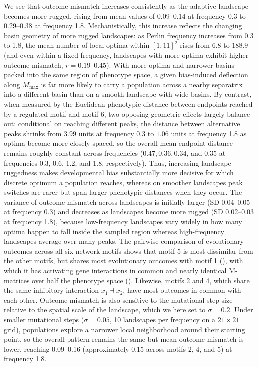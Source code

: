 We see that outcome mismatch increases consistently as the adaptive landscape becomes more rugged, rising from mean values of 0.09--0.14 at frequency 0.3 to 0.29--0.38 at frequency 1.8.
Mechanistically, this increase reflects the changing basin geometry of more rugged landscapes: as Perlin frequency increases from 0.3 to 1.8, the mean number of local optima within $[1, 11]^2$ rises from $6.8$ to $188.9$ (and even within a fixed frequency, landscapes with more optima exhibit higher outcome mismatch, $r = 0.19\text{--}0.45$).
With more optima and narrower basins packed into the same region of phenotype space, a given bias-induced deflection along $M_{\max}$ is far more likely to carry a population across a nearby separatrix into a different basin than on a smooth landscape with wide basins.
By contrast, when measured by the Euclidean phenotypic distance between endpoints reached by a regulated motif and motif 6, two opposing geometric effects largely balance out: conditional on reaching different peaks, the distance between alternative peaks shrinks from $3.99$ units at frequency 0.3 to $1.06$ units at frequency 1.8 as optima become more closely spaced, so the overall mean endpoint distance remains roughly constant across frequencies ($0.47, 0.36, 0.34$, and $0.35$ at frequencies 0.3, 0.6, 1.2, and 1.8, respectively).
Thus, increasing landscape ruggedness makes developmental bias substantially more decisive for which discrete optimum a population reaches, whereas on smoother landscapes peak switches are rarer but span larger phenotypic distances when they occur.
The variance of outcome mismatch across landscapes is initially larger (SD 0.04--0.05 at frequency 0.3) and decreases as landscapes become more rugged (SD 0.02--0.03 at frequency 1.8), because low-frequency landscapes vary widely in how many optima happen to fall inside the sampled region whereas high-frequency landscapes average over many peaks.
The pairwise comparison of evolutionary outcomes across all six network motifs shows that motif 5 is most dissimilar from the other motifs, but shares most evolutionary outcomes with motif 1 (), with which it has activating gene interactions in common and nearly identical M-matrices over half the phenotype space ().
Likewise, motifs 2 and 4, which share the same inhibitory interaction $x_1 \dashv x_2$, have most outcomes in common with each other.
Outcome mismatch is also sensitive to the mutational step size relative to the spatial scale of the landscape, which we here set to $\sigma=0.2$.
Under smaller mutational steps ($\sigma=0.05$, 10 landscapes per frequency on a $21 \times 21$ grid), populations explore a narrower local neighborhood around their starting point, so the overall pattern remains the same but mean outcome mismatch is lower, reaching 0.09--0.16 (approximately 0.15 across motifs 2, 4, and 5) at frequency 1.8.

